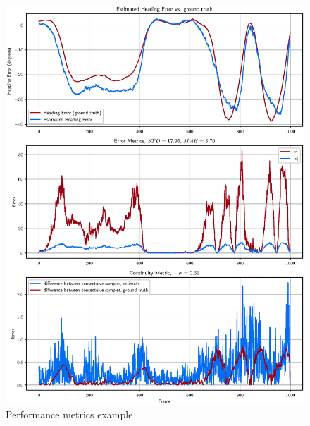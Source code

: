 \documentclass[a4paper,12pt,sort&compress]{article}
\begin{document}
    \begin{figure}
        \centering
        \includegraphics[width=\linewidth]{figures/performance_metrics_example.eps}
        \caption{Performance metrics example}
        \label{fig:performance_metrics_example}
    \end{figure}


\end{document}
